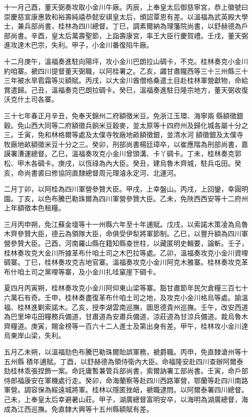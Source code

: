 \begin{pinyinscope}
十一月己酉，董天弼奏攻取小金川牛廠。丙辰，上奉皇太后御慈寧宮，恭上徽號曰崇慶慈宣康惠敦和裕壽純禧恭懿安祺皇太后，頒詔覃恩有差。以溫福為武英殿大學士，兼兵部尚書，桂林為四川總督。丁巳，調素爾納為理籓院尚書，以舒赫德為戶部尚書。辛酉，皇太后萬壽聖節，上詣壽康宮，率王大臣行慶賀禮。壬戌，董天弼進攻達木巴宗，失利。甲子，小金川番復陷牛廠。

十二月庚午，溫福奏進駐向陽坪，攻小金川巴朗拉山碉卡，不克。桂林奏克小金川約咱寨。褫四川提督董天弼職，以阿桂署之。乙亥，蠲甘肅隴西等三十三州縣三十三年被水旱雹霜等災額賦。丙戌，以大金川酋僧格桑遣土目赴桂林軍營獻物，命給賞遣歸。己丑，溫福奏克巴朗拉碉卡。癸巳，溫福奏進駐日隆宗地方，董天弼收復沃克什土司各寨。

三十七年春正月辛丑，免奉天錦州二府額徵米豆。免浙江玉環、海寧兩縣額徵銀穀。免山西大同等二府額徵兵餉米豆穀麥，並太原等十四府州及歸化城各屬十分之三。壬寅，免和林格爾等處及太僕寺牧廠地畝額徵銀，並清水河額徵銀及太僕寺牧廠地畝額徵米豆十分之三。癸卯，刑部尚書楊廷璋卒，以崔應階為刑部尚書，嘉謨署漕運總督。乙巳，溫福奏攻克小金川曾頭溝、卡丫碉卡。丁未，桂林奏克郭松、甲木各碉卡。庚戌，以恆祿為內大臣。癸丑，建烏魯木齊城，駐兵屯田。癸亥，命尚書裘曰修協同直隸總督周元理濬永定河、北運河。

二月丁卯，以阿桂為四川軍營參贊大臣。甲戌，上幸盤山。丙戌，上回鑾，幸圓明園。丁亥，以色布騰巴勒珠爾為四川軍營參贊大臣。乙未，免陜西西安等十二府州上年額徵本色租糧。

三月丙申朔，免江蘇金壇等十一州縣六年至十年逋賦。戊戌，以索諾木策凌為烏魯木齊參贊大臣，德云為領隊大臣，命俱受伊犁將軍節制。乙巳，以豐升額為四川軍營參贊大臣。己酉，河南羅山縣在籍知縣查世柱，以藏匿明史輯要，論斬。壬子，桂林奏攻克大金川所據革布什咱土司之木巴拉等處。乙卯，溫福奏攻克小金川資哩碉寨。丁巳，桂林奏攻克吉地官寨。溫福奏攻克小金川阿克木雅寨。桂林奏攻克革布什咱土司之黨哩等寨，及小金川扎哇窠崖下碉卡。

夏四月丙寅朔，桂林奏攻克小金川阿仰東山梁等寨。豁甘肅節年民欠倉糧三百七十六萬石有奇。壬申，桂林奏盡復革布什咱土司之地，及攻克小金川格烏等處。諭溫福、桂林進剿索諾木。乙亥，授李湖雲南巡撫，圖思德貴州巡撫。壬午，改安西道為巴里坤屯田糧務兵備道，甘肅道為安肅兵備道，涼莊道為甘涼兵備道。裁烏魯木齊糧道。庚寅，賜金榜等一百六十二人進士及第出身有差。甲午，桂林攻小金川達烏東岸山梁，失利。

五月乙未朔，以溫福劾色布騰巴勒珠爾貽誤軍務，褫爵職。丙申，免直隸滄州等十五州縣積年逋賦。丁酉，以舒赫德為領侍衛內大臣。命福隆安赴四川查辦阿爾泰劾桂林乖張捏飾一案。命託庸暫兼管兵部尚書，索爾訥署工部尚書。壬寅，命戶部侍郎福康安在軍機處行走。癸卯，命海蘭察等赴四川西路軍營，鄂蘭等赴四川南路軍營。調容保為綏遠城將軍。桂林以隱匿挫衄，褫職逮問。以阿爾泰署四川總督。己未，上奉皇太后幸避暑山莊。甲子，湖廣總督富明安卒，以海明為湖廣總督，海成為江西巡撫。免直隸大興等十五州縣額賦有差。


\end{pinyinscope}
